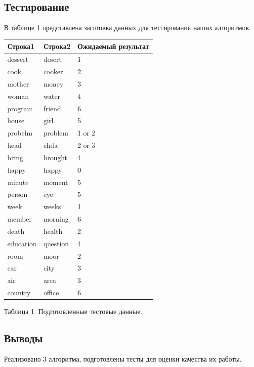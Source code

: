 \documentclass[a4paper,14pt]{article} %
\begin{document}
	\subsection{Тестирование}
	\hfill
	
	В таблице 1 представлена заготовка данных для тестирования наших алгоритмов. 
	\begin{center}
		\begin{tabular}{ | l | l | l |}
			\hline
			\textbf{Строка1} & \textbf{Строка2} & \textbf{Ожидаемый результат} \\ \hline
			dessert & desert & 1 \\ \hline
			cook & cooker & 2 \\ \hline
			mother & money & 3 \\ \hline
			woman & water & 4 \\ \hline
			program & friend & 6 \\ \hline
			house & girl & 5 \\ \hline
			probelm & problem & 1 or 2 \\ \hline
			head & ehda & 2 or 3 \\ \hline
			bring & brought & 4 \\ \hline
			happy & happy & 0\\  \hline
			minute & moment & 5 \\ \hline
			person & eye & 5 \\ \hline
			week & weeks & 1 \\ \hline
			member & morning & 6 \\ \hline
			death & health & 2 \\ \hline
			education & question & 4 \\ \hline
			room & moor & 2 \\ \hline
			car & city & 3 \\ \hline
			air & area & 3 \\ \hline
			country & office & 6 \\ \hline
		\end{tabular}
		
		\hfill
		
		Таблица 1.
		Подготовленные тестовые данные.  
	\end{center}
	\subsection{Выводы}
	
        \hfill
        
        Реализовано 3 алгоритма, подготовлены тесты для оценки качества их работы. 
        
\end{document}
